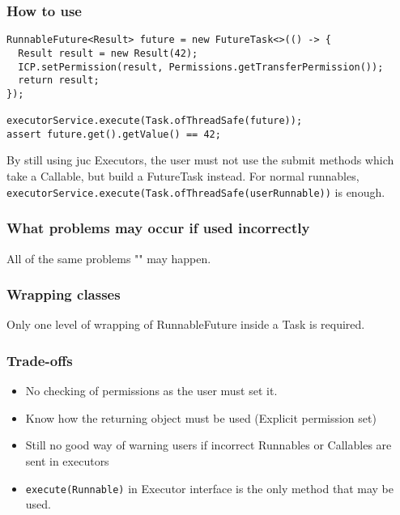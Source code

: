 \subsubsection*{How to use}
\begin{lstlisting}[caption=Wrap RunnableFuture in Task]
RunnableFuture<Result> future = new FutureTask<>(() -> {
  Result result = new Result(42);
  ICP.setPermission(result, Permissions.getTransferPermission());
  return result;
});

executorService.execute(Task.ofThreadSafe(future));
assert future.get().getValue() == 42;
    \end{lstlisting}

By still using \gls{juc} Executors, the user must not use the submit methods which take a Callable,
but build a FutureTask instead.
For normal runnables, \lstinline{executorService.execute(Task.ofThreadSafe(userRunnable))} is enough.


\subsubsection*{What problems may occur if used incorrectly}
All of the same problems "" may happen.

\subsubsection*{Wrapping classes}


Only one level of wrapping of RunnableFuture inside a Task is required.

\subsubsection*{Trade-offs}
\begin{itemize}
    \item No checking of permissions as the user must set it.
    \item Know how the returning object must be used (Explicit permission set)
    \item Still no good way of warning users if incorrect Runnables or Callables are sent in executors
    \item \lstinline{execute(Runnable)} in Executor interface is the only method that may be used.
\end{itemize}

